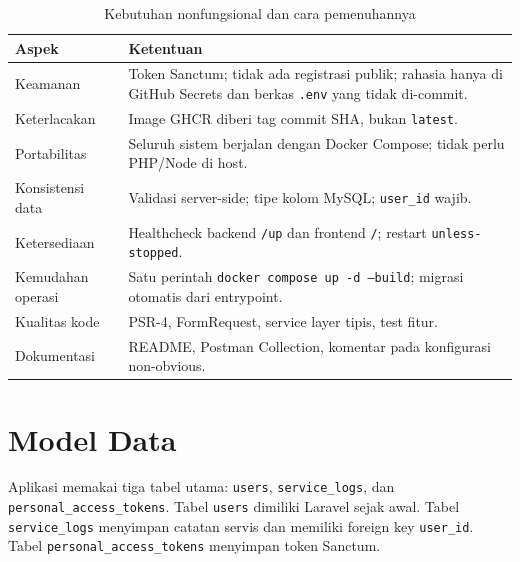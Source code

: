 \documentclass[12pt,a4paper,oneside]{book}
\begin{document}
\begin{table}[H]
\centering
\caption{Kebutuhan nonfungsional dan cara pemenuhannya}
\label{tab:nonfungsi}
\begin{tabularx}{\textwidth}{@{}p{3.2cm} X@{}}
\toprule
\textbf{Aspek} & \textbf{Ketentuan} \\
\midrule
Keamanan & Token Sanctum; tidak ada registrasi publik; rahasia hanya di GitHub Secrets dan berkas \texttt{.env} yang tidak di-commit. \\
Keterlacakan & Image GHCR diberi tag commit SHA, bukan \texttt{latest}. \\
Portabilitas & Seluruh sistem berjalan dengan Docker Compose; tidak perlu PHP/Node di host. \\
Konsistensi data & Validasi server-side; tipe kolom MySQL; \texttt{user\_id} wajib. \\
Ketersediaan & Healthcheck backend \texttt{/up} dan frontend \texttt{/}; restart \texttt{unless-stopped}. \\
Kemudahan operasi & Satu perintah \texttt{docker compose up -d --build}; migrasi otomatis dari entrypoint. \\
Kualitas kode & PSR-4, FormRequest, service layer tipis, test fitur. \\
Dokumentasi & README, Postman Collection, komentar pada konfigurasi non-obvious. \\
\bottomrule
\end{tabularx}
\end{table}

\section{Model Data}

Aplikasi memakai tiga tabel utama: \texttt{users}, \texttt{service\_logs}, dan
\texttt{personal\_access\_tokens}. Tabel \texttt{users} dimiliki Laravel sejak awal.
Tabel \texttt{service\_logs} menyimpan catatan servis dan memiliki foreign key
\texttt{user\_id}. Tabel \texttt{personal\_access\_tokens} menyimpan token Sanctum.
\end{document}
